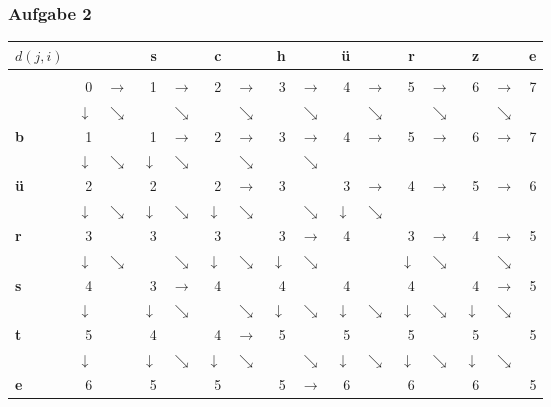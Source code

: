 \documentclass{beamer}
\begin{document}
\begin{frame} \frametitle{Aufgabe 2}
	\centering
	\renewcommand*{\arraystretch}{.7}
	\setlength{\tabcolsep}{3pt}
	\begin{tabular}{l|rrrrrrrlrrrlrlr}
		$d(j,i)$ &       &       & \textbf{s} &       & \textbf{c} &       & \textbf{h} &       & \textbf{ü} &       & \textbf{r} &       & \textbf{z} &       & \textbf{e} \\ \hline \\
		& 0     & $\rightarrow$ & 1     & $\rightarrow$ & 2     & $\rightarrow$ & 3     & $\rightarrow$ & 4     & $\rightarrow$ & 5     & $\rightarrow$ & 6     & $\rightarrow$ & 7 \\
		& $\downarrow$ & $\searrow$ &       & $\searrow$ &       & $\searrow$ &       & $\searrow$ &       & $\searrow$ &       & $\searrow$ &       & $\searrow$ &  \\
		\textbf{b}     & 1     &       & 1     & $\rightarrow$ & 2     & $\rightarrow$ & 3     & $\rightarrow$ & 4     & $\rightarrow$ & 5     & $\rightarrow$ & 6     & $\rightarrow$ & 7 \\
		& $\downarrow$ & $\searrow$ & $\downarrow$ & $\searrow$ &       & $\searrow$ &       & $\searrow$ &       &       &       &       &       &       &  \\
		\textbf{ü}     & 2     &       & 2     &       & 2     & $\rightarrow$ & 3     &       & 3     & $\rightarrow$ & 4     & $\rightarrow$ & 5     & $\rightarrow$ & 6 \\
		& $\downarrow$ & $\searrow$ & $\downarrow$ & $\searrow$ & $\downarrow$ & $\searrow$ &       & $\searrow$ & $\downarrow$ & $\searrow$ &       &       &       &       &  \\
		\textbf{r}     & 3     &       & 3     &       & 3     &       & 3     & $\rightarrow$ & 4     &       & 3     & $\rightarrow$ & 4     & $\rightarrow$ & 5 \\
		& $\downarrow$ & $\searrow$ &       & $\searrow$ & $\downarrow$ & $\searrow$ & $\downarrow$ & $\searrow$ &       &       & $\downarrow$ & $\searrow$ &       & $\searrow$ &  \\
		\textbf{s}     & 4     &       & 3     & $\rightarrow$ & 4     &       & 4     &       & 4     &       & 4     &       & 4     & $\rightarrow$ & 5 \\
		& $\downarrow$ &       & $\downarrow$ & $\searrow$ &       & $\searrow$ & $\downarrow$ & $\searrow$ & $\downarrow$ & $\searrow$ & $\downarrow$ & $\searrow$ & $\downarrow$ & $\searrow$ &  \\
		\textbf{t}     & 5     &       & 4     &       & 4     & $\rightarrow$ & 5     &       & 5     &       & 5     &       & 5     &       & 5 \\
		& $\downarrow$ &       & $\downarrow$ & $\searrow$ & $\downarrow$ & $\searrow$ &       & $\searrow$ & $\downarrow$ & $\searrow$ & $\downarrow$ & $\searrow$ & $\downarrow$ & $\searrow$ &  \\
		\textbf{e}     & 6     &       & 5     &       & 5     &       & 5     & $\rightarrow$ & 6     &       & 6     & & 6     &  & 5 \\
	\end{tabular}%


\end{frame}
\end{document}
